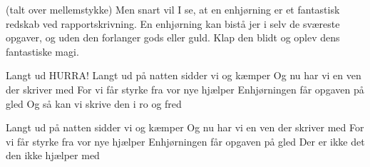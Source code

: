 \documentclass[a4paper,11pt]{article}
\begin{document}
\begin{song}
 (talt over mellemstykke) Men snart vil I se, at en enhjørning er et fantastisk redskab ved rapportskrivning. En enhjørning kan bistå jer i selv de sværeste opgaver, og uden den forlanger gods eller guld. Klap den blidt og oplev dens fantastiske magi.

 Langt ud
 HURRA!
 Langt ud på natten sidder vi og kæmper
 Og nu har vi en ven der skriver med
For vi får styrke fra vor nye hjælper
Enhjørningen får opgaven på gled
 Og så kan vi skrive den i ro og fred

 Langt ud på natten sidder vi og kæmper
Og nu har vi en ven der skriver med
For vi får styrke fra vor nye hjælper
Enhjørningen får opgaven på gled
Der er ikke det den ikke hjælper med

\end{song}
\end{document}
